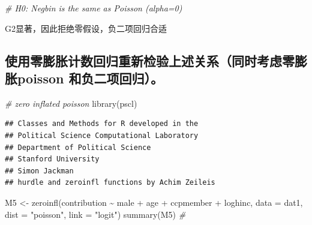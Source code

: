 \documentclass[
]{ctexart}
\newenvironment{Shaded}{\begin{snugshade}}{\end{snugshade}}
\newcommand{\AttributeTok}[1]{\textcolor[rgb]{0.77,0.63,0.00}{#1}}
\newcommand{\CommentTok}[1]{\textcolor[rgb]{0.56,0.35,0.01}{\textit{#1}}}
\newcommand{\FunctionTok}[1]{\textcolor[rgb]{0.00,0.00,0.00}{#1}}
\newcommand{\NormalTok}[1]{#1}
\newcommand{\OtherTok}[1]{\textcolor[rgb]{0.56,0.35,0.01}{#1}}
\newcommand{\SpecialCharTok}[1]{\textcolor[rgb]{0.00,0.00,0.00}{#1}}
\newcommand{\StringTok}[1]{\textcolor[rgb]{0.31,0.60,0.02}{#1}}
\begin{document}
\begin{Shaded}
\begin{Highlighting}[]
\CommentTok{\# H0: Negbin is the same as Poisson (alpha=0)}
\end{Highlighting}
\end{Shaded}

G2显著，因此拒绝零假设，负二项回归合适

\hypertarget{ux4f7fux7528ux96f6ux81a8ux80c0ux8ba1ux6570ux56deux5f52ux91cdux65b0ux68c0ux9a8cux4e0aux8ff0ux5173ux7cfbux540cux65f6ux8003ux8651ux96f6ux81a8ux80c0poisson-ux548cux8d1fux4e8cux9879ux56deux5f52}{%
\subsection{使用零膨胀计数回归重新检验上述关系（同时考虑零膨胀poisson
和负二项回归）。}\label{ux4f7fux7528ux96f6ux81a8ux80c0ux8ba1ux6570ux56deux5f52ux91cdux65b0ux68c0ux9a8cux4e0aux8ff0ux5173ux7cfbux540cux65f6ux8003ux8651ux96f6ux81a8ux80c0poisson-ux548cux8d1fux4e8cux9879ux56deux5f52}}

\begin{Shaded}
\begin{Highlighting}[]
\CommentTok{\# zero inflated poisson}
\FunctionTok{library}\NormalTok{(pscl)}
\end{Highlighting}
\end{Shaded}

\begin{verbatim}
## Classes and Methods for R developed in the
## Political Science Computational Laboratory
## Department of Political Science
## Stanford University
## Simon Jackman
## hurdle and zeroinfl functions by Achim Zeileis
\end{verbatim}

\begin{Shaded}
\begin{Highlighting}[]
\NormalTok{M5 }\OtherTok{\textless{}{-}} \FunctionTok{zeroinfl}\NormalTok{(contribution }\SpecialCharTok{\textasciitilde{}}\NormalTok{ male }\SpecialCharTok{+}\NormalTok{ age }\SpecialCharTok{+}\NormalTok{ ccpmember }\SpecialCharTok{+}\NormalTok{ loghinc, }\AttributeTok{data =}\NormalTok{ dat1, }\AttributeTok{dist =} \StringTok{"poisson"}\NormalTok{, }\AttributeTok{link =} \StringTok{"logit"}\NormalTok{)}
\FunctionTok{summary}\NormalTok{(M5)  }\CommentTok{\#}
\end{Highlighting}
\end{Shaded}
\end{document}
